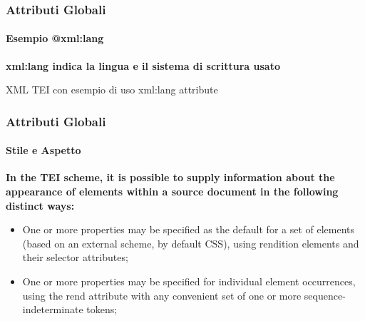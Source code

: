 
\begin{frame} [fragile]
    \frametitle{Attributi Globali}
    \framesubtitle{Esempio \textrm{@xml:lang}}
    \addtocounter{nframe}{1}

    \textbf{\textrm{xml:lang} indica la lingua e il sistema di scrittura usato}
        \begin{block}{XML TEI con esempio di uso \textrm{xml:lang} attribute}
            {\langatt}
        \end{block}
\end{frame}


\begin{frame}
    \frametitle{Attributi Globali}
    \framesubtitle{Stile e Aspetto}
    \addtocounter{nframe}{1}

    
    \textbf{In the TEI scheme, it is possible to supply information about the appearance of elements within a source document in the following distinct ways:}

    \begin{itemize}
        \item One or more properties may be specified as the default for a set of elements (based on an external scheme, by default CSS), using rendition elements and their selector attributes;
        \item One or more properties may be specified for individual element occurrences, using the rend attribute with any convenient set of one or more sequence-indeterminate tokens;
    \end{itemize}
\end{frame}

